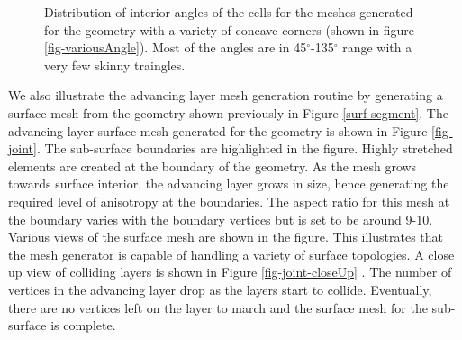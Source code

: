 \documentclass[conf]{new-aiaa}
\begin{document}
\begin{figure}
\begin{subfigure}{0.5\textwidth}
\caption{}
\label{fig-va-dist-high}
\end{subfigure}
\caption{Distribution of interior angles of the cells for the meshes generated for the geometry with a variety of concave corners (shown in figure \ref{fig-variousAngle}). Most of the angles are in 45$^\circ$-135$^\circ$ range with a very few skinny traingles.}
\label{fig-va-angle-distribution}
\end{figure}


We also illustrate the advancing layer mesh generation routine by generating a surface mesh from the geometry shown previously in Figure \ref{surf-segment}. The advancing layer surface mesh generated for the geometry is shown in Figure \ref{fig-joint}. The sub-surface boundaries are highlighted in the figure. Highly stretched elements are created at the boundary of the geometry. As the mesh grows towards surface interior, the advancing layer grows in size, hence generating the required level of anisotropy at the boundaries. The aspect ratio for this mesh at the boundary varies with the boundary vertices but is set to be around 9-10. Various views of the surface mesh are shown in the figure. This illustrates that the mesh generator is capable of handling a variety of surface topologies. A close up view of colliding layers is shown in Figure \ref{fig-joint-closeUp} . The number of vertices in the advancing layer drop as the layers start to collide. Eventually, there are no vertices left on the layer to march and the surface mesh for the sub-surface is complete.
\end{document}
